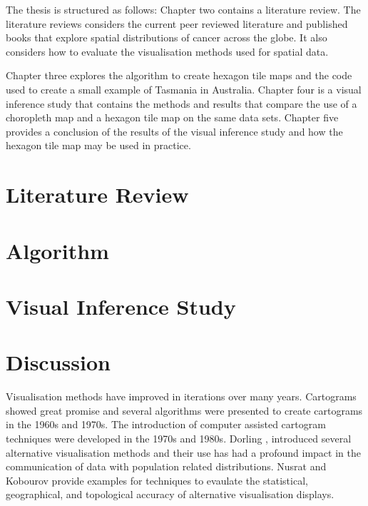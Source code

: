 \documentclass{monashthesis}
\begin{document}
The thesis is structured as follows: Chapter two contains a literature review.
The literature reviews considers the current peer reviewed literature and published books that explore spatial distributions of cancer across the globe.
It also considers how to evaluate the visualisation methods used for spatial data.

Chapter three explores the algorithm to create hexagon tile maps and the code used to create a small example of Tasmania in Australia.
Chapter four is a visual inference study that contains the methods and results that compare the use of a choropleth map and a hexagon tile map on the same data sets.
Chapter five provides a conclusion of the results of the visual inference study and how the hexagon tile map may be used in practice.

\hypertarget{ch:literature}{%
\chapter{Literature Review}\label{ch:literature}}



\hypertarget{ch:algorithm}{%
\chapter{Algorithm}\label{ch:algorithm}}



\hypertarget{ch:experiment}{%
\chapter{Visual Inference Study}\label{ch:experiment}}



\hypertarget{discussion}{%
\chapter{Discussion}\label{discussion}}

Visualisation methods have improved in iterations over many years. Cartograms showed great promise and several algorithms were presented to create cartograms in the 1960s and 1970s.
The introduction of computer assisted cartogram techniques were developed in the 1970s and 1980s. Dorling \autocite{TVSSS}, \autocite{ACTUC} introduced several alternative visualisation methods and their use has had a profound impact in the communication of data with population related distributions.
Nusrat and Kobourov provide examples for techniques to evaulate the statistical, geographical, and topological accuracy of alternative visualisation displays.
\end{document}
